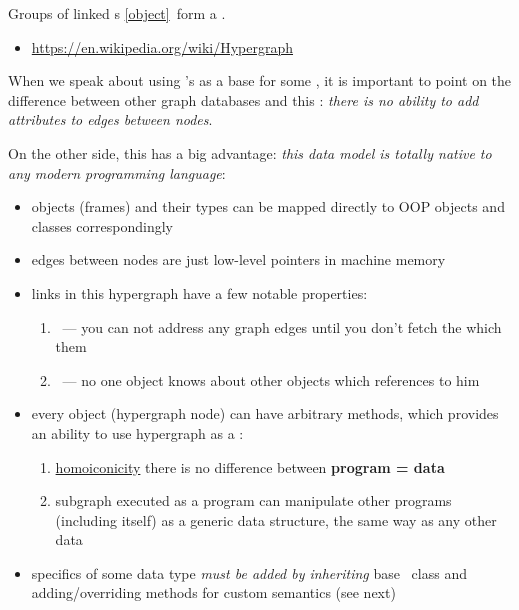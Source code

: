\clearpage
{}\label{og}

Groups of linked s \ref{object}\ form a .

\begin{itemize}
    \item \url{https://en.wikipedia.org/wiki/Hypergraph}
\end{itemize}

When we speak about using \mel's  as a base for some
, it is important to point on the difference between
other graph databases and this : \emph{there is no
ability to add attributes to edges between nodes}.

On the other side, this  has a big advantage: \emph{this
data model is totally native to any modern programming language}:
\begin{itemize}

    \item objects (frames) and their types can be mapped directly to OOP objects
    and classes correspondingly

    \item edges between nodes are just low-level pointers in machine memory

    \item links in this hypergraph have a few notable properties:
    \begin{enumerate}
        \item {}\ --- you can not address any graph
        edges until you don't fetch the  which 
        them
        \item {}\ --- no one object knows about other objects
        which references to him
    \end{enumerate}

    \item every object (hypergraph node) can have arbitrary methods, which
    provides an ability to use hypergraph as a :
    \begin{enumerate}
        \item \href{https://en.wikipedia.org/wiki/Homoiconicity}{homoiconicity}
        there is no difference between \textbf{program = data}
        \item subgraph executed as a program can manipulate other programs
        (including itself) as a generic data structure, the same way as any
        other data
    \end{enumerate}

    \item specifics of some data type \emph{must be added by inheriting} base
    \ class and adding/overriding methods for custom semantics
    (see next)

\end{itemize}
